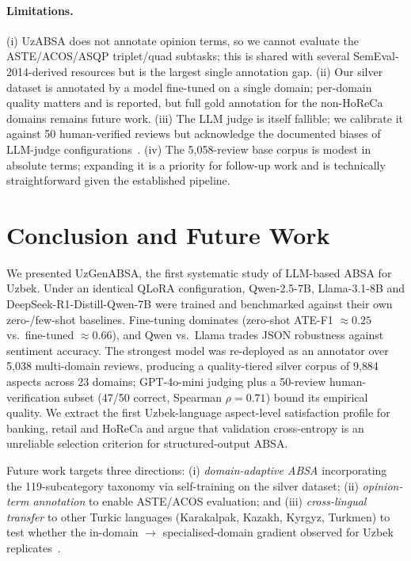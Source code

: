 \documentclass[runningheads]{llncs}
\begin{document}
\paragraph{Limitations.}
(i) UzABSA does not annotate opinion terms, so we cannot evaluate the
ASTE/ACOS/ASQP triplet/quad subtasks; this is shared with several
SemEval-2014-derived resources but is the largest single annotation gap.
(ii) Our silver dataset is annotated by a model fine-tuned on a single
domain; per-domain quality matters and is reported, but full gold
annotation for the non-HoReCa domains remains future work. (iii) The
LLM judge is itself fallible; we calibrate it against 50 human-verified
reviews but acknowledge the documented biases of LLM-judge
configurations~\cite{2506.22316}. (iv) The 5{,}058-review base corpus is
modest in absolute terms; expanding it is a priority for follow-up work
and is technically straightforward given the established pipeline.

\section{Conclusion and Future Work}
\label{sec:conclusion}

We presented UzGenABSA, the first systematic study of LLM-based ABSA for
Uzbek. Under an identical QLoRA configuration, Qwen-2.5-7B, Llama-3.1-8B
and DeepSeek-R1-Distill-Qwen-7B were trained and benchmarked against their
own zero-/few-shot baselines. Fine-tuning dominates (zero-shot ATE-F1
$\approx 0.25$ vs.\ fine-tuned $\approx 0.66$), and Qwen vs.\ Llama trades
JSON robustness against sentiment accuracy. The strongest model was
re-deployed as an annotator over 5{,}038 multi-domain reviews, producing a
quality-tiered silver corpus of 9{,}884 aspects across 23 domains;
GPT-4o-mini judging plus a 50-review human-verification subset (47/50
correct, Spearman $\rho{=}0.71$) bound its empirical quality. We extract
the first Uzbek-language aspect-level satisfaction profile for banking,
retail and HoReCa and argue that validation cross-entropy is an unreliable
selection criterion for structured-output ABSA.

Future work targets three directions: (i) \emph{domain-adaptive ABSA}
incorporating the 119-subcategory taxonomy via self-training on the silver
dataset; (ii) \emph{opinion-term annotation} to enable ASTE/ACOS
evaluation; and (iii) \emph{cross-lingual transfer} to other Turkic
languages (Karakalpak, Kazakh, Kyrgyz, Turkmen) to test whether the
in-domain $\to$ specialised-domain gradient observed for Uzbek
replicates~\cite{blasi-etal-2022-systematic,uzbekendingssanat}.
\end{document}
